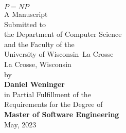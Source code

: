 \begin{titlepage}
	\begin{center}
		\vspace*{0.5in}
		\begin{doublespace}
			\LARGE \textbf{\(P = NP\)} \\
			\vspace*{1in}
			\normalsize
			A Manuscript \\
			Submitted to \\
			the Department of Computer Science \\
			and the Faculty of the\\
			University of Wisconsin--La Crosse \\
			La Crosse, Wisconsin \\
			\vspace*{0.5in}
			by \\
			\large
			\textbf{Daniel Weninger} \\

			\vspace*{0.5in}
			\normalsize
			in Partial Fulfillment of the \\
			Requirements for the Degree of\\
			\Large{\textbf{Master of Software Engineering}} \\
			\normalsize
			May, 2023
		\end{doublespace}
	\end{center}
\end{titlepage}
